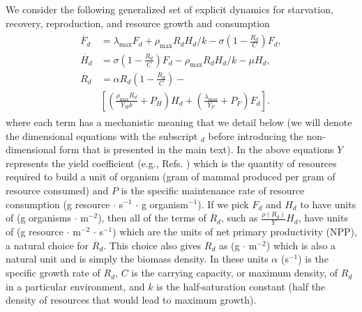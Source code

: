 \documentclass[twocolumn,preprintnumbers,amsmath,amssymb,superscriptaddress]{revtex4}
\begin{document}
We consider the following generalized set of explicit dynamics for starvation, recovery, reproduction, and resource growth and consumption
\begin{align}
\begin{split}
\dot{F_{d}} &= \lambda_{\text{max}} F_{d} + \rho_{\text{max}}R_{d}H_{d}/k - \sigma \left(1-\frac{R_{d}}{C}\right)F_{d},  \\
\dot{H_{d}} &= \sigma \left(1-\frac{R_{d}}{C}\right)F_{d} - \rho_{\text{max}}R_{d} H_{d}/k - \mu H_{d},  \\
\dot{R_{d}} &= \alpha R_{d}\left(1-\frac{R_{d}}{C}\right) -\\
& \left[\left(\frac{\rho_{\text{max}}R_{d}}{Y_{H}k}+P_{H}\right)H_{d}+\left(\frac{\lambda_{\text{max}}}{Y_{F}}+P_{F}\right)F_{d}\right].
\label{bigdynamics}
\end{split}
\end{align}
where each term has a mechanistic meaning that we detail below (we will denote the dimensional equations with the subscript $_{d}$ before introducing the non-dimensional form that is presented in the main text). In the above equations $Y$ represents the yield coefficient (e.g., Refs. \citep{pirt,Heijnen}) which is the quantity of resources required to build a unit of organism (gram of mammal produced per gram of resource consumed) and $P$ is the specific maintenance rate of resource consumption (g resource $\cdot$ s$^{-1}$ $\cdot$ g organism$^{-1}$). If we pick $F_{d}$ and $H_{d}$ to have units of (g organisms $\cdot$ m$^{-2}$), then all of the terms of $\dot{R_{d}}$, such as $\frac{\rho\left(R_{d}\right)}{Y}H_{d}$, have units of (g resource $\cdot$ m$^{-2}$ $\cdot$ s$^{-1}$) which are the units of net primary productivity (NPP), a natural choice for $\dot{R_{d}}$. This choice also gives $R_{d}$ as (g $\cdot$ m$^{-2}$) which is also a natural unit and is simply the biomass density. In these units $\alpha$ (s$^{-1}$) is the specific growth rate of $R_{d}$, $C$ is the carrying capacity, or maximum density, of $R_{d}$ in a particular environment, and $k$ is the half-saturation constant (half the density of resources that would lead to maximum growth).
\end{document}
